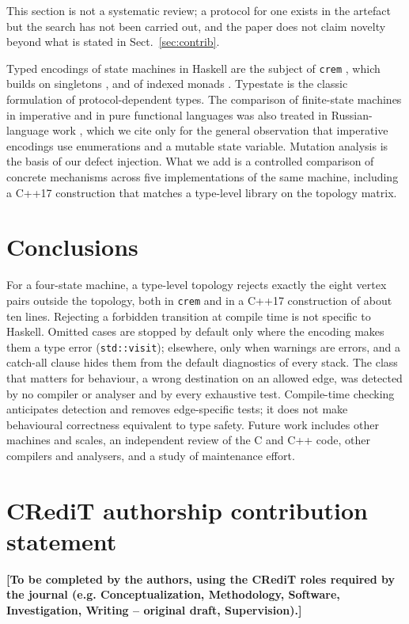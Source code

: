 \documentclass[review,12pt]{elsarticle}
\newcommand{\code}[1]{\texttt{#1}}
\newcommand{\crem}{\texttt{crem}}
\begin{document}
This section is not a systematic review; a protocol for one exists in the artefact but the search has not been carried out, and the paper does not claim novelty beyond what is stated in Sect.~\ref{sec:contrib}.

Typed encodings of state machines in Haskell are the subject of \crem{} \cite{perone2023crem}, which builds on singletons \cite{eisenberg2012singletons}, and of indexed monads \cite{atkey2009parameterised}. Typestate \cite{strom1986typestate} is the classic formulation of protocol-dependent types. The comparison of finite-state machines in imperative and in pure functional languages was also treated in Russian-language work \cite{malakhovski2009fsm}, which we cite only for the general observation that imperative encodings use enumerations and a mutable state variable. Mutation analysis \cite{demillo1978hints,jia2011mutation} is the basis of our defect injection. What we add is a controlled comparison of concrete mechanisms across five implementations of the same machine, including a C++17 construction that matches a type-level library on the topology matrix.

\section{Conclusions}
\label{sec:conclusions}

For a four-state machine, a type-level topology rejects exactly the eight vertex pairs outside the topology, both in \crem{} and in a C++17 construction of about ten lines. Rejecting a forbidden transition at compile time is not specific to Haskell. Omitted cases are stopped by default only where the encoding makes them a type error (\code{std::visit}); elsewhere, only when warnings are errors, and a catch-all clause hides them from the default diagnostics of every stack. The class that matters for behaviour, a wrong destination on an allowed edge, was detected by no compiler or analyser and by every exhaustive test. Compile-time checking anticipates detection and removes edge-specific tests; it does not make behavioural correctness equivalent to type safety. Future work includes other machines and scales, an independent review of the C and C++ code, other compilers and analysers, and a study of maintenance effort.

\section*{CRediT authorship contribution statement}
\textbf{[To be completed by the authors, using the CRediT roles required by the journal (e.g. Conceptualization, Methodology, Software, Investigation, Writing -- original draft, Supervision).]}
\end{document}
